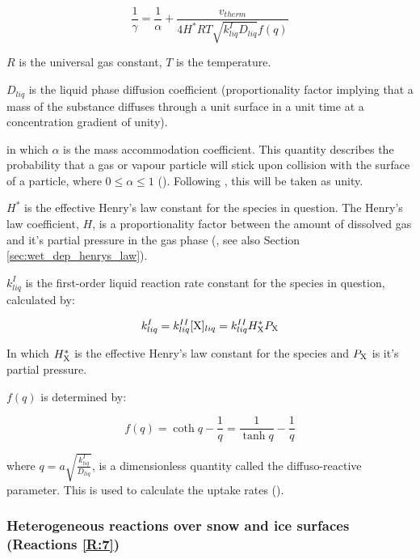 \begin{equation}
    \frac{1}{\gamma} = \frac{1}{\alpha}+ \frac{v_{therm}}{4H^*RT\sqrt{k_{liq}^ID_{liq}}f(q)}
    \label{eq:upt_coeff}
\end{equation}

\medskip

$R$ is the universal gas constant, $T$ is the temperature.

\medskip

$D_{liq}$ is the liquid phase diffusion coefficient (proportionality factor implying that a mass of the substance diffuses through a unit surface in a unit time at a concentration gradient of unity). 

\medskip

in which $\alpha$ is the mass accommodation coefficient. This quantity describes the probability that a gas or vapour particle will stick upon collision with the surface of a particle, where $0\leq\alpha\leq1$ (\cite{SeinfeldSpyros}). Following \cite{CAO}, this will be taken as unity. 

\medskip

$H^*$ is the effective Henry's law constant for the species in question. The Henry's law coefficient, $H$, is a proportionality factor between the amount of dissolved gas and it's partial pressure in the gas phase (\cite{Sander2015}, see also Section \ref{sec:wet_dep_henrys_law}).  

$k_{liq}^I$ is the first-order liquid reaction rate constant for the species in question, calculated by: 

\begin{equation}
    k_{liq}^I = k_{liq}^{II}[\mathrm{X}]_{liq}= k_{liq}^{II}H^*_{\mathrm{X}}P_{\mathrm{X}}
\end{equation}

In which $H^*_{\mathrm{X}}$ is the effective Henry's law constant for the species and $P_{\mathrm{X}}$ is it's partial pressure.

\medskip

$f(q)$ is determined by: 

\begin{equation}
    f(q) = \coth{q} -\frac{1}{q} = \frac{1}{\tanh{q}} -\frac{1}{q}
\end{equation}

where $q = a\sqrt{\frac{k_{liq}^I}{D_{liq}}}$, is a dimensionless quantity called the diffuso-reactive parameter. This is used to calculate the uptake rates (\cite{Hanson1994}). 


\subsubsection{Heterogeneous reactions over snow and ice surfaces (Reactions \ref{R:7})}\label{sec:snow_ice_react}



